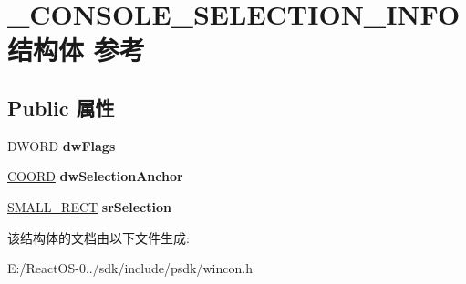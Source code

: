 \hypertarget{struct___c_o_n_s_o_l_e___s_e_l_e_c_t_i_o_n___i_n_f_o}{}\section{\+\_\+\+C\+O\+N\+S\+O\+L\+E\+\_\+\+S\+E\+L\+E\+C\+T\+I\+O\+N\+\_\+\+I\+N\+F\+O结构体 参考}
\label{struct___c_o_n_s_o_l_e___s_e_l_e_c_t_i_o_n___i_n_f_o}
\subsection*{Public 属性}
\begin{DoxyCompactItemize}
\item 
\mbox{\label{struct___c_o_n_s_o_l_e___s_e_l_e_c_t_i_o_n___i_n_f_o_abbb6233a64ba293d47c732744686b3ab}} 
D\+W\+O\+RD {\bfseries dw\+Flags}
\item 
\mbox{\label{struct___c_o_n_s_o_l_e___s_e_l_e_c_t_i_o_n___i_n_f_o_ad2eb4c0da6e11173dfeb0d8a7fca591f}} 
\hyperlink{struct___c_o_o_r_d}{C\+O\+O\+RD} {\bfseries dw\+Selection\+Anchor}
\item 
\mbox{\label{struct___c_o_n_s_o_l_e___s_e_l_e_c_t_i_o_n___i_n_f_o_a09f511839844fe8e5e7be28eeb625e85}} 
\hyperlink{structtag_s_m_a_l_l___r_e_c_t}{S\+M\+A\+L\+L\+\_\+\+R\+E\+CT} {\bfseries sr\+Selection}
\end{DoxyCompactItemize}


该结构体的文档由以下文件生成\+:\begin{DoxyCompactItemize}
\item 
E\+:/\+React\+O\+S-\/0../sdk/include/psdk/wincon.\+h\end{DoxyCompactItemize}
